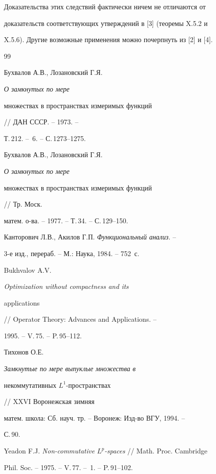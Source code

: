 Доказательства этих следствий фактически ничем не отличаются от 


доказательств соответствующих утверждений в [3] (теоремы X.5.2 и 


X.5.6). Другие возможные применения можно почерпнуть из [2] и [4].








\begin{thebibliography}{99}







Бухвалов А.В., Лозановский Г.Я. {\em О замкнутых по мере 


множествах в пространствах измеримых функций} // ДАН СССР. -- 1973. --


Т.\,212. -- \No\,6. -- С.\,1273--1275.




Бухвалов А.В., Лозановский Г.Я. {\em О замкнутых по мере 


множествах в пространствах измеримых функций} // Тр. Моск.


матем. о-ва. -- 1977. -- Т.\,34. -- С.\,129--150. 




Канторович Л.В., Акилов Г.П. {\em Функциональный анализ}. -- 


3-е изд., перераб. -- М.: Наука, 1984. -- 752~с.




Bukhvalov A.V. {\em Optimization without compactness and its 


applications} // Operator Theory: Advances and Applications. -- 


1995. -- V.\,75. -- P.\,95--112.




Тихонов О.Е. {\em Замкнутые по мере выпуклые множества в 


некоммутативных $L^1$-прост\-ран\-ст\-вах} // XXVI Воронежская зимняя 


матем. школа: Сб. науч. тр. -- Воронеж: Изд-во ВГУ, 1994. --


С.\,90.




Yeadon F.J. {\em Non-commutative $L^p$-spaces} // Math. Proc. Cambridge 


Phil. Soc. -- 1975. -- V.\,77. -- \No\,1. -- P.\,91--102. 



\end{thebibliography}
